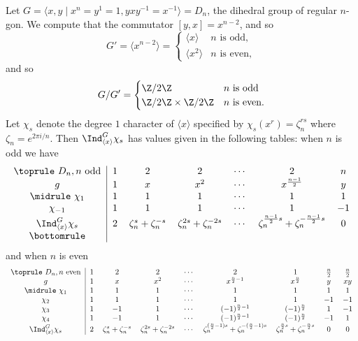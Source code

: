 \begin{example}
Let $G=\langle x,y\mid x^n=y^1=1,yxy^{-1}=x^{-1}\rangle=D_{n}$, the dihedral group of regular $n$-gon. We compute that the commutator $[y,x]=x^{n-2}$, and so
\[G'=\langle x^{n-2}\rangle=\begin{cases}
\langle x\rangle&\text{$n$ is odd},\\
\langle x^2\rangle&\text{$n$ is even},
\end{cases}\]
and so
\[G/G'=\begin{cases}
\Z/2\Z&\text{$n$ is odd}\\
\Z/2\Z\times\Z/2\Z&\text{$n$ is even}.
\end{cases}\]
Let $\chi_s$ denote the degree $1$ character of $\langle x\rangle$ specified by $\chi_s(x^r)=\zeta_n^{rs}$ where $\zeta_n=e^{2\pi i/n}$. Then $\Ind^G_{\langle x\rangle}\chi_s$ has values given in the following tables: when $n$ is odd we have
\[\begin{tabular}{c|cccccc}
\toprule
$D_n,\text{$n$ odd}$&$1$&$2$&$2$&$\cdots$&$2$&$n$\\
$g$&$1$&$x$&$x^2$&$\cdots$&$x^{\frac{n-1}{2}}$&$y$\\
\midrule
$\chi_1$&$1$&$1$&$1$&$\cdots$&$1$&$1$\\
$\chi_{-1}$&$1$&$1$&$1$&$\cdots$&$1$&$-1$\\
$\Ind^G_{\langle x\rangle}\chi_s$&$2$&$\zeta_n^s+\zeta_n^{-s}$&$\zeta_n^{2s}+\zeta_n^{-2s}$&$\cdots$&$\zeta_n^{\frac{n-1}{2}s}+\zeta_n^{-\frac{n-1}{2}s}$&$0$\\
\bottomrule
\end{tabular}\]
and when $n$ is even
\[\begin{tabular}{c|cccccccc}
\toprule
$D_n,\text{$n$ even}$&$1$&$2$&$2$&$\cdots$&$2$&$1$&$\frac{n}{2}$&$\frac{n}{2}$\\
$g$&$1$&$x$&$x^2$&$\cdots$&$x^{\frac{n}{2}-1}$&$x^{\frac{n}{2}}$&$y$&$xy$\\
\midrule
$\chi_1$&$1$&$1$&$1$&$\cdots$&$1$&$1$&$1$&$1$\\
$\chi_{2}$&$1$&$1$&$1$&$\cdots$&$1$&$1$&$-1$&$-1$\\
$\chi_{3}$&$1$&$-1$&$1$&$\cdots$&$(-1)^{\frac{n}{2}-1}$&$(-1)^{\frac{n}{2}}$&$1$&$-1$\\
$\chi_{4}$&$1$&$-1$&$1$&$\cdots$&$(-1)^{\frac{n}{2}-1}$&$(-1)^{\frac{n}{2}}$&$-1$&$1$\\
$\Ind^G_{\langle x\rangle}\chi_s$&$2$&$\zeta_n^s+\zeta_n^{-s}$&$\zeta_n^{2s}+\zeta_n^{-2s}$&$\cdots$&$\zeta_n^{(\frac{n}{2}-1)s}+\zeta_n^{-(\frac{n}{2}-1)s}$&$\zeta_n^{\frac{n}{2}s}+\zeta_n^{-\frac{n}{2}s}$&$0$&$0$\\

\end{tabular}\]
\end{example}
